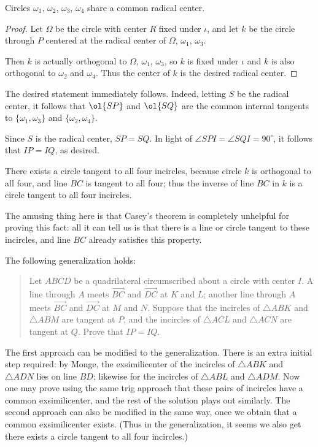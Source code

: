\documentclass[11pt]{scrartcl}
\begin{document}
\begin{claim*}
    Circles $\omega_1$, $\omega_2$, $\omega_3$, $\omega_4$
    share a common radical center.
\end{claim*}
\begin{proof}
    Let $\Omega$ be the circle with center $R$
    fixed under $\iota$,
    and let $k$ be the circle through $P$
    centered at the radical center of $\Omega$, $\omega_1$, $\omega_3$.

    Then $k$ is actually orthogonal to $\Omega$, $\omega_1$, $\omega_3$,
    so $k$ is fixed under $\iota$
    and $k$ is also orthogonal to $\omega_2$ and $\omega_4$.
    Thus the center of $k$ is the desired radical center.
\end{proof}

The desired statement immediately follows.
Indeed, letting $S$ be the radical center,
it follows that $\ol{SP}$ and $\ol{SQ}$
are the common internal tangents to $\{\omega_1, \omega_3\}$ and $\{\omega_2, \omega_4\}$.

Since $S$ is the radical center,
$SP = SQ$.
In light of $\angle SPI = \angle SQI = 90^{\circ}$,
it follows that $IP = IQ$, as desired.

\begin{remark*}
  There exists a circle tangent to all four incircles,
  because circle $k$ is orthogonal to all four,
  and line $BC$ is tangent to all four;
  thus the inverse of line $BC$ in $k$ is a circle
  tangent to all four incircles.

  The amusing thing here is that Casey's theorem is completely unhelpful
  for proving this fact:
  all it can tell us is that there is a line or circle tangent to these incircles,
  and line $BC$ already satisfies this property.
\end{remark*}

\begin{remark*}
  The following generalization holds:
  \begin{quote}
  Let $ABCD$ be a quadrilateral
  circumscribed about a circle with center $I$.
  A line through $A$ meets $\overrightarrow{BC}$ and $\overrightarrow{DC}$
  at $K$ and $L$;
  another line through $A$ meets $\overrightarrow{BC}$ and $\overrightarrow{DC}$
  at $M$ and $N$.
  Suppose that the incircles of $\triangle ABK$ and $\triangle ABM$ are tangent at $P$,
  and the incircles of $\triangle ACL$ and $\triangle ACN$ are tangent at $Q$.
  Prove that $IP = IQ$.
  \end{quote}

  The first approach can be modified to the generalization.
  There is an extra initial step required:
  by Monge, the exsimilicenter of the incircles of $\triangle ABK$ and $\triangle ADN$
  lies on line $BD$;
  likewise for the incircles of $\triangle ABL$ and $\triangle ADM$.
  Now one may prove using the same trig approach that these pairs of incircles
  have a common exsimilicenter,
  and the rest of the solution plays out similarly.
  The second approach can also be modified in the same way,
  once we obtain that a common exsimilicenter exists.
  (Thus in the generalization, it seems we also get
  there exists a circle tangent to all four incircles.)
\end{remark*}
\pagebreak
\end{document}
